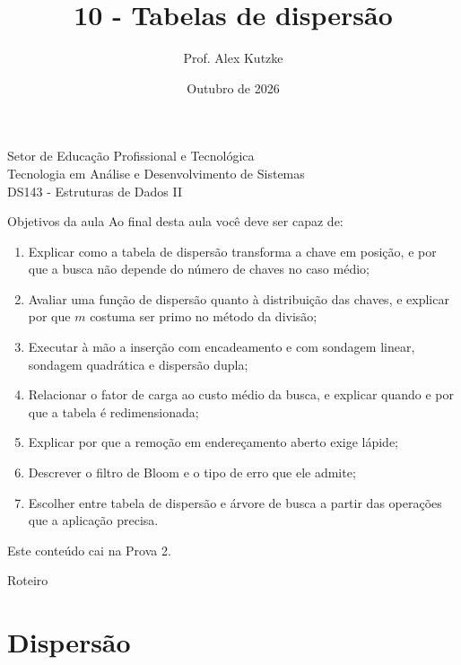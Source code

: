 \documentclass{beamer}
\title{10 - Tabelas de dispersão}
\author{Prof. Alex Kutzke}
\date{Outubro de 2026}
\begin{document}
\begin{frame}
	\begin{center}
		\large{Setor de Educação Profissional e Tecnológica}\\
		Tecnologia em Análise e Desenvolvimento de Sistemas\\
		\vspace{1cm}
		\small{DS143 - Estruturas de Dados II}
	\end{center}
	\titlepage
\end{frame}

\begin{frame}{Objetivos da aula}
	\footnotesize
	Ao final desta aula você deve ser capaz de:
	\begin{enumerate}
		\itemsep=0pt
		\item Explicar como a tabela de dispersão transforma a chave em posição, e
		      por que a busca não depende do número de chaves no caso médio;
		\item Avaliar uma função de dispersão quanto à distribuição das chaves, e
		      explicar por que $m$ costuma ser primo no método da divisão;
		\item Executar à mão a inserção com encadeamento e com sondagem linear,
		      sondagem quadrática e dispersão dupla;
		\item Relacionar o fator de carga ao custo médio da busca, e explicar
		      quando e por que a tabela é redimensionada;
		\item Explicar por que a remoção em endereçamento aberto exige lápide;
		\item Descrever o filtro de Bloom e o tipo de erro que ele admite;
		\item Escolher entre tabela de dispersão e árvore de busca a partir das
		      operações que a aplicação precisa.
	\end{enumerate}

	\vspace{0.1cm}
	Este conteúdo cai na Prova 2.
\end{frame}

\begin{frame}{Roteiro}
	\tableofcontents
\end{frame}

\section{Dispersão}
\end{document}
